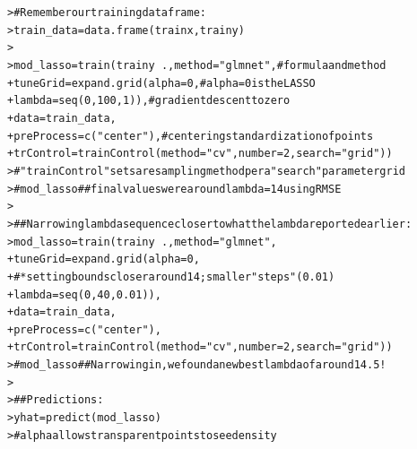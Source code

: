 \documentclass[12pt]{article}\usepackage[]{graphicx}\usepackage[]{color}
\makeatletter
\newcommand{\hlnum}[1]{\textcolor[rgb]{0.82,0.78,0.62}{#1}}%
\newcommand{\hlstr}[1]{\textcolor[rgb]{0.82,0.78,0.62}{#1}}%
\newcommand{\hlcom}[1]{\textcolor[rgb]{0.404,0.408,0.42}{#1}}%
\newcommand{\hlopt}[1]{\textcolor[rgb]{0.882,0.878,0.898}{#1}}%
\newcommand{\hlstd}[1]{\textcolor[rgb]{0.882,0.878,0.898}{#1}}%
\newcommand{\hlkwb}[1]{\textcolor[rgb]{0.902,0.675,0.196}{#1}}%
\newcommand{\hlkwc}[1]{\textcolor[rgb]{0.812,0.522,0.388}{#1}}%
\newcommand{\hlkwd}[1]{\textcolor[rgb]{0.733,0.388,0.812}{#1}}%
\newenvironment{kframe}{%
 \def\at@end@of@kframe{}%
 \ifinner\ifhmode%
  \def\at@end@of@kframe{\end{minipage}}%
  \begin{minipage}{\columnwidth}%
 \fi\fi%
 \def\FrameCommand##1{\hskip\@totalleftmargin \hskip-\fboxsep
 \colorbox{shadecolor}{##1}\hskip-\fboxsep
     \hskip-\linewidth \hskip-\@totalleftmargin \hskip\columnwidth}%
 \MakeFramed {\advance\hsize-\width
   \@totalleftmargin\z@ \linewidth\hsize
   \@setminipage}}%
 {\par\unskip\endMakeFramed%
 \at@end@of@kframe}
\newenvironment{knitrout}{}{} %
\makeatother
\begin{document}
\begin{flushleft}
\begin{center}
\begin{knitrout}
\color{fgcolor}\begin{kframe}
\begin{alltt}
\hlstd{> }\hlcom{# Remember our training data frame:}
\hlstd{> }\hlstd{train_data} \hlkwb{=} \hlkwd{data.frame}\hlstd{(trainx, trainy)}
\hlstd{> }
\hlstd{> }\hlstd{mod_lasso} \hlkwb{=} \hlkwd{train}\hlstd{(trainy}\hlopt{~}\hlstd{.,} \hlkwc{method}\hlstd{=}\hlstr{"glmnet"}\hlstd{,}\hlcom{# formula and method}
\hlstd{+ }     \hlkwc{tuneGrid}\hlstd{=}\hlkwd{expand.grid}\hlstd{(}\hlkwc{alpha} \hlstd{=} \hlnum{0}\hlstd{,} \hlcom{# alpha=0 is the LASSO}
\hlstd{+ }               \hlkwc{lambda} \hlstd{=} \hlkwd{seq}\hlstd{(}\hlnum{0}\hlstd{,}\hlnum{100}\hlstd{,}\hlnum{1}\hlstd{)),} \hlcom{#gradient descent to zero}
\hlstd{+ }     \hlkwc{data} \hlstd{= train_data,}
\hlstd{+ }     \hlkwc{preProcess} \hlstd{=} \hlkwd{c}\hlstd{(}\hlstr{"center"}\hlstd{),}\hlcom{# centering standardization of points}
\hlstd{+ }     \hlkwc{trControl} \hlstd{=} \hlkwd{trainControl}\hlstd{(}\hlkwc{method}\hlstd{=}\hlstr{"cv"}\hlstd{,}\hlkwc{number}\hlstd{=}\hlnum{2}\hlstd{,} \hlkwc{search}\hlstd{=}\hlstr{"grid"}\hlstd{))}
\hlstd{> }\hlcom{# "trainControl" sets a resampling method per a "search" parameter grid}
\hlstd{> }\hlcom{# mod_lasso ## final values were around lambda = 14 using RMSE}
\hlstd{> }
\hlstd{> }\hlcom{## Narrowing lambda sequence closer to what the lambda reported earlier:}
\hlstd{> }\hlstd{mod_lasso} \hlkwb{=} \hlkwd{train}\hlstd{(trainy}\hlopt{~}\hlstd{.,} \hlkwc{method} \hlstd{=} \hlstr{"glmnet"}\hlstd{,}
\hlstd{+ }     \hlkwc{tuneGrid} \hlstd{=} \hlkwd{expand.grid}\hlstd{(}\hlkwc{alpha} \hlstd{=} \hlnum{0}\hlstd{,}
\hlstd{+ }     \hlcom{# *setting bounds closer around 14; smaller "steps" (0.01)}
\hlstd{+ }                         \hlkwc{lambda} \hlstd{=} \hlkwd{seq}\hlstd{(}\hlnum{0}\hlstd{,}\hlnum{40}\hlstd{,}\hlnum{0.01}\hlstd{)),}
\hlstd{+ }     \hlkwc{data} \hlstd{= train_data,}
\hlstd{+ }     \hlkwc{preProcess} \hlstd{=} \hlkwd{c}\hlstd{(}\hlstr{"center"}\hlstd{),}
\hlstd{+ }     \hlkwc{trControl} \hlstd{=} \hlkwd{trainControl}\hlstd{(}\hlkwc{method}\hlstd{=}\hlstr{"cv"}\hlstd{,}\hlkwc{number}\hlstd{=}\hlnum{2}\hlstd{,} \hlkwc{search}\hlstd{=}\hlstr{"grid"}\hlstd{))}
\hlstd{> }     \hlcom{# mod_lasso ## Narrowing in, we found a new best lambda of around 14.5!}
\hlstd{> }
\hlstd{> }\hlcom{## Predictions:}
\hlstd{> }\hlstd{yhat} \hlkwb{=} \hlkwd{predict}\hlstd{(mod_lasso)}
\hlstd{> }\hlcom{# alpha allows transparent points to see density}

\end{alltt}
\end{kframe}
\end{knitrout}
\end{center}
\end{flushleft}
\end{document}
